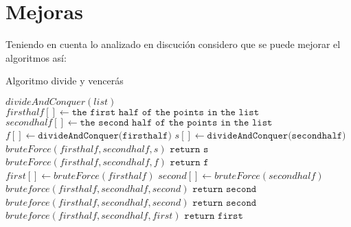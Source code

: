 \section{Mejoras}
Teniendo en cuenta lo analizado en discución considero que se puede mejorar el algoritmos así:
\begin{algorithm}[h!]
\caption{Algoritmo divide y vencerás}
\begin{algorithmic}
\State $divideAndConquer(list)$
    \State $ firsthalf[] \gets \texttt{the first half of the points in the list}$
    \State $ secondhalf[] \gets \texttt{the second half of the points in the list}$
    \State $ f[] \gets \texttt{divideAndConquer(firsthalf)}$
    \State $ s[] \gets \texttt{divideAndConquer(secondhalf)}$
    \State $bruteForce(firsthalf, secondhalf, s)$
    \State$\texttt{return s}$
    \Else
    \State $bruteForce(firsthalf, secondhalf, f)$
    \State$\texttt{return f}$
    \EndIf
    \Else
     \State $ first[] \gets bruteForce(firsthalf)$
    \State $ second[] \gets bruteForce(secondhalf)$
        \State $bruteforce(firsthalf, secondhalf,second)$
        \State $\texttt{return second}$
    \Else
            \State $bruteforce(firsthalf, secondhalf,second)$
            \State $\texttt{return second}$
        \Else
            \State $bruteforce(firsthalf, secondhalf,first)$
            \State $\texttt{return first}$
         \EndIf
    \EndIf
\EndIf
\end{algorithmic}    
\end{algorithm}
\FloatBarrier
